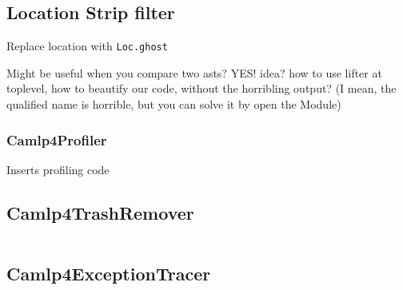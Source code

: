 \subsection{Location Strip filter}
Replace location with \verb|Loc.ghost|


Might be useful when you compare two asts? YES!  idea? how to use
lifter at toplevel, how to beautify our code, without the horribling
output? (I mean, the qualified name is horrible, but you can solve it
by open the Module)

\subsubsection{Camlp4Profiler}
Inserts profiling code


\subsection{Camlp4TrashRemover}
\inputminted[fontsize=\scriptsize, fontsize=\scriptsize, lastline=40]{ocaml}{camlp4/code/jake/pa_trashmover.ml}

\subsection{Camlp4ExceptionTracer}




